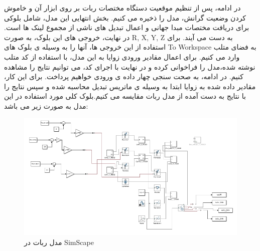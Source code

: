 \documentclass{article}
\begin{document}
در ادامه، پس از تنظیم موقعیت دستگاه مختصات ربات بر روی ابزار آن و خاموش کردن وضعیت گرانش، مدل را ذخیره می کنیم. بخش انتهایی این مدل، شامل بلوکی برای دریافت مختصات مبدا جهانی و اعمال تبدیل های ناشی از مجموع لینک ها است. در نهایت، خروجی های این بلوک، به صورت R, X, Y, Z به دست می آیند. برای استفاده از این خروجی ها، آنها را به وسیله ی بلوک های To Workspace
به فضای متلب وارد می کنیم.
برای اعمال مقادیر ورودی زوایا به این مدل، با استفاده از کد متلب نوشته شده،مدل را فراخوانی کرده و در نهایت با اجرای کد، می توانیم نتایج را مشاهده کنیم.
در ادامه، به صحت سنجی چهار داده ی ورودی خواهیم پرداخت. برای این کار، مقادیر داده شده به  زوایا ابتدا به وسیله ی ماتریس تبدیل محاسبه شده و سپس نتایج را با نتایج به دست آمده از مدل ربات مقایسه می کنیم.بلوک کلی مورد استفاده در این مدل به صورت زیر می باشد:
\begin{figure}[H]
    \centering
    \includegraphics[width=1\linewidth]{simulink.PNG}
    \caption{مدل ربات در SimScape}
    \label{fig:Simulink}
\end{figure}
\end{document}
